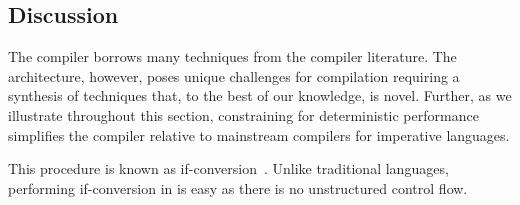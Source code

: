 \subsection{Discussion}
The \pktlanguage compiler borrows many techniques from the compiler literature.
The \absmachine architecture, however, poses unique challenges for compilation
requiring a synthesis of techniques that, to the best of our knowledge, is
novel. Further, as we illustrate throughout this section, constraining
\pktlanguage for deterministic performance simplifies the \pktlanguage
compiler relative to mainstream compilers for imperative languages.

This procedure is known as
if-conversion~\cite{if_conversion}. Unlike traditional languages, performing
if-conversion in \pktlanguage is easy as there is no unstructured control
flow.  
